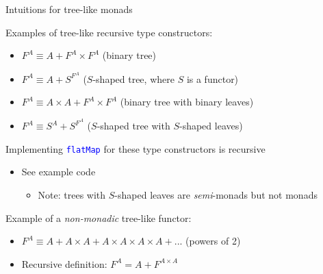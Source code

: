 \documentclass[english]{beamer}
\begin{document}
\begin{frame}{Intuitions for tree-like monads}

Examples of tree-like recursive type constructors:
\begin{itemize}
\item $F^{A}\equiv A+F^{A}\times F^{A}$ (binary tree)
\item $F^{A}\equiv A+S^{F^{A}}$ ($S$-shaped tree, where $S$ is a functor)
\item $F^{A}\equiv A\times A+F^{A}\times F^{A}$ (binary tree with binary
leaves)
\item $F^{A}\equiv S^{A}+S^{F^{A}}$ ($S$-shaped tree with $S$-shaped
leaves)
\end{itemize}
Implementing \texttt{\textcolor{blue}{\footnotesize{}flatMap}} for
these type constructors is recursive
\begin{itemize}
\item See example code
\begin{itemize}
\item Note: trees with $S$-shaped leaves are \emph{semi}-monads but not
monads
\end{itemize}
\end{itemize}
Example of a \emph{non-monadic} tree-like functor:
\begin{itemize}
\item $F^{A}\equiv A+A\times A+A\times A\times A\times A+...$ (powers of
2)
\item Recursive definition: $F^{A}=A+F^{A\times A}$
\end{itemize}
\end{frame}
\end{document}

